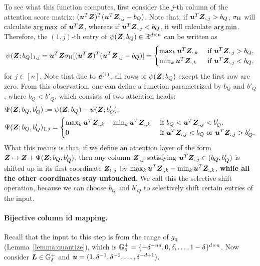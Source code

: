 To see what this function computes, first consider the $j$-th column of the attention score matrix: $({\bm{u}}^T {\bm{Z}})^T ({\bm{u}}^T {\bm{Z}}_{:,j} - b_Q)$. Note that, if ${\bm{u}}^T {\bm{Z}}_{:,j}>b_Q$, $\sigma_{\rm H}$ will calculate $\operatorname*{arg\,max}$ of ${\bm{u}}^T {\bm{Z}}$, whereas if ${\bm{u}}^T {\bm{Z}}_{:,j}<b_Q$, it will calculate $\operatorname*{arg\,min}$. Therefore, the $(1,j)$-th entry of $\psi({\bm{Z}}; b_Q) \in \mathbb{R}^{d \times n}$ can be written as
\begin{equation*}
\psi({\bm{Z}}; b_Q)_{1, j} = 
{\bm{u}}^T {\bm{Z}} \sigma_{\rm H} [ ({\bm{u}}^T {\bm{Z}})^T ({\bm{u}}^T {\bm{Z}}_{:,j} - b_Q) ] =
\begin{cases}
    \max_k {\bm{u}}^T {\bm{Z}}_{:,k} & \text{ if } {\bm{u}}^T {\bm{Z}}_{:,j} > b_Q, \\
    \min_k {\bm{u}}^T {\bm{Z}}_{:,k} & \text{ if } {\bm{u}}^T {\bm{Z}}_{:,j} < b_Q,
\end{cases}
\end{equation*}
for $j \in [n]$. Note that due to ${\bm{e}}^{(1)}$, all rows of $\psi({\bm{Z}}; b_Q)$ except the first row are zero.
From this observation, one can define a function parametrized by $b_Q$ and $b'_Q$, where $b_Q < b'_Q$, which consists of two attention heads:
\begin{align*}
    &\Psi({\bm{Z}}; b_Q, b'_Q) := \psi({\bm{Z}}; b_Q) - \psi({\bm{Z}}; b'_Q),\\
    &\Psi({\bm{Z}}; b_Q, b'_Q)_{1, j} =
    \begin{cases}
        \max_k {\bm{u}}^T {\bm{Z}}_{:,k} - \min_k {\bm{u}}^T {\bm{Z}}_{:,k} & \text{ if } b_Q < {\bm{u}}^T {\bm{Z}}_{:,j} < b'_Q, \\
        0 & \text{ if } {\bm{u}}^T {\bm{Z}}_{:,j} < b_Q \text{ or } {\bm{u}}^T {\bm{Z}}_{:,j} > b'_Q.
    \end{cases}
\end{align*}
What this means is that, if we define an attention layer of the form ${\bm{Z}} \mapsto {\bm{Z}} + \Psi({\bm{Z}};b_Q,b'_Q)$, then any column ${\bm{Z}}_{:,j}$ satisfying ${\bm{u}}^T {\bm{Z}}_{:,j} \in (b_Q,b'_Q)$ is shifted up in its first coordinate ${\bm{Z}}_{1,j}$ by $\max_k {\bm{u}}^T {\bm{Z}}_{:,k} - \min_k {\bm{u}}^T {\bm{Z}}_{:,k}$, \textbf{while all the other coordinates stay untouched}. We call this the selective shift operation, because we can choose $b_Q$ and $b'_Q$ to selectively shift certain entries of the input.

\paragraph{Bijective column id mapping.}
Recall that the input to this step is from the range of $g_{\rm q}$ (Lemma~\ref{lemma:quantize}), which is ${\mathbb{G}}^+_{\delta} = \{ -\delta^{-nd}, 0, \delta, \dots, 1-\delta \}^{d \times n}$. Now consider ${\bm{L}} \in {\mathbb{G}}^+_{\delta}$ and ${\bm{u}} = (1, \delta^{-1}, \delta^{-2}, \dots, \delta^{-d+1})$.

